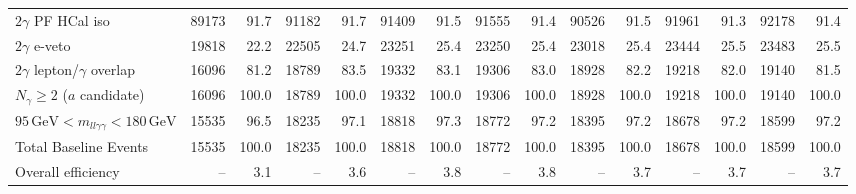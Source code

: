 \begin{table}[htbp]
{\begin{tabular}{lrrrrrrrrrrrrrr}
$2\gamma$ PF HCal iso & 89173 & 91.7 & 91182 & 91.7 & 91409 & 91.5 & 91555 & 91.4 & 90526 & 91.5 & 91961 & 91.3 & 92178 & 91.4 \\
$2\gamma$ e-veto & 19818 & 22.2 & 22505 & 24.7 & 23251 & 25.4 & 23250 & 25.4 & 23018 & 25.4 & 23444 & 25.5 & 23483 & 25.5 \\
$2\gamma$ lepton/$\gamma$ overlap & 16096 & 81.2 & 18789 & 83.5 & 19332 & 83.1 & 19306 & 83.0 & 18928 & 82.2 & 19218 & 82.0 & 19140 & 81.5 \\
$N_{\gamma}\geq 2$ ($a$ candidate) & 16096 & 100.0 & 18789 & 100.0 & 19332 & 100.0 & 19306 & 100.0 & 18928 & 100.0 & 19218 & 100.0 & 19140 & 100.0 \\
$95\,\mathrm{GeV} < m_{ll\gamma\gamma} < 180\,\mathrm{GeV}$ & 15535 & 96.5 & 18235 & 97.1 & 18818 & 97.3 & 18772 & 97.2 & 18395 & 97.2 & 18678 & 97.2 & 18599 & 97.2 \\
Total Baseline Events & 15535 & 100.0 & 18235 & 100.0 & 18818 & 100.0 & 18772 & 100.0 & 18395 & 100.0 & 18678 & 100.0 & 18599 & 100.0 \\
\hline
Overall efficiency & -- & 3.1 & -- & 3.6 & -- & 3.8 & -- & 3.8 & -- & 3.7 & -- & 3.7 & -- & 3.7 \\
\hline
\end{tabular}%
}
\end{table}

